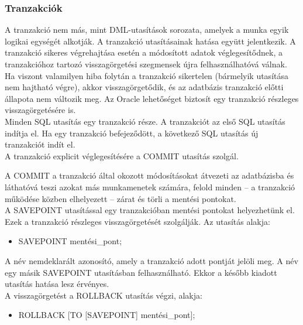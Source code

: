 \documentclass[tikz,12pt,margin=0px]{article}
\begin{document}
    \subsubsection*{Tranzakciók}

    \noindent A tranzakció nem más, mint DML-utasítások sorozata, amelyek a munka egyik logikai egységét alkotják. A tranzakció utasításainak hatása együtt jelentkezik. A tranzakció sikeres végrehajtása esetén a módosított adatok véglegesítődnek, a tranzakcióhoz tartozó visszagörgetési szegmensek újra felhasználhatóvá válnak. Ha viszont valamilyen hiba folytán a tranzakció sikertelen (bármelyik utasítása nem hajtható végre), akkor visszagörgetődik, és az adatbázis tranzakció előtti állapota nem változik meg. Az Oracle lehetőséget biztosít egy tranzakció részleges visszagörgetésére is. \\

    \noindent Minden SQL utasítás egy tranzakció része. A tranzakciót az első SQL utasítás indítja el. Ha egy tranzakció befejeződött, a következő SQL utasítás új tranzakciót indít el. \\

    \noindent A tranzakció explicit véglegesítésére a COMMIT utasítás szolgál.

    \noindent A COMMIT a tranzakció által okozott módosításokat átvezeti az adatbázisba és láthatóvá teszi azokat más munkamenetek számára, felold minden – a tranzakció működése közben elhelyezett – zárat és törli a mentési pontokat.\\

    \noindent A SAVEPOINT utasítással egy tranzakcióban mentési pontokat helyezhetünk el. Ezek a tranzakció részleges visszagörgetését szolgálják. Az utasítás alakja:
    \begin{itemize}
        \item SAVEPOINT mentési\_pont;
    \end{itemize}

    \noindent A név nemdeklarált azonosító, amely a tranzakció adott pontját jelöli meg. A név egy másik SAVEPOINT utasításban felhasználható. Ekkor a később kiadott utasítás hatása lesz érvényes.\\

    \noindent A visszagörgetést a ROLLBACK utasítás végzi, alakja:
    \begin{itemize}
        \item ROLLBACK [TO [SAVEPOINT] mentési\_pont];
    \end{itemize}
\end{document}
